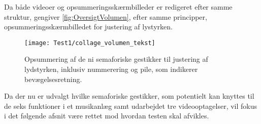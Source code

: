 \noindent
%
Da både videoer og opsummeringsskærmbilleder er redigeret efter samme struktur, gengiver \autoref{fig:OversigtVolumen}, efter samme principper, opsummeringsskærmbilledet for justering af lystyrken.  
%
\begin{figure}[H]
	\centering
	\texttt{[image: Test1/collage\_volumen\_tekst]}
	\caption{Opsummering af de ni semaforiske gestikker til justering af lydstyrken, inklusiv nummerering og pile, som indikerer bevægelsesretning.}
	\label{fig:OversigtVolumen}
\end{figure}
\noindent
%
Da der nu er udvalgt hvilke semaforiske gestikker, som potentielt kan knyttes til de seks funktioner i et musikanlæg samt udarbejdet tre videooptagelser, vil fokus i det følgende afsnit være rettet mod hvordan testen skal afvikles. 

